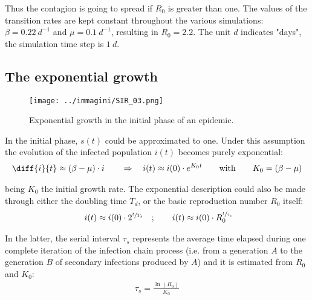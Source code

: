 \documentclass[DIV=12, BCOR=0pt]{scrartcl}  %
\begin{document}
  Thus the contagion is going to spread if $R_{0}$ is greater than one. The values of the transition rates are kept constant throughout the various simulations: $\beta = 0.22 \ d^{-1}$ and $\mu = 0.1 \ d^{-1}$, resulting in $R_{0} = 2.2$. The unit $d$ indicates "days", the simulation time step is $1 \ d$.
  
  
  
  
  
  \subsection{The exponential growth}
  
  \begin{figure}[h!]
  	\centering
  	\texttt{[image: ../immagini/SIR\_03.png]}
  	\caption{Exponential growth in the initial phase of an epidemic. }
  	\label{fig:SIRexp}
  \end{figure}
  
  In the initial phase, $s(t)$ could be approximated to one. %
  Under this assumption the evolution of the infected population $i(t)$ becomes purely exponential:
  \begin{align}
  	\diff{i}{t} \approx  (\beta - \mu) \cdot i \qquad \Rightarrow \quad 	i(t) \approx i(0) \cdot e^{K_{0} t} \qquad \mathrm{with} \qquad K_{0} = (\beta - \mu)
  \end{align}
	
	being $K_{0}$ the initial growth rate. The exponential description could also be made through either the doubling time $T_{d}$, or the basic reproduction number $R_{0}$ itself:
	\begin{align}
		\ i(t) \approx i(0) \cdot 2^{\sfrac{t}{T_{d}}} \quad ; \qquad i(t) \approx i(0) \cdot R_{0}^{\sfrac{t}{\tau_{s}}}
	\end{align}
	
	In the latter, the serial interval $\tau_{s}$ represents the average time elapsed during one complete iteration of the infection chain process (i.e. from a generation $A$ to the generation $B$ of secondary infections produced by $A$) and it is estimated from $R_{0}$ and $K_{0}$: 
	\begin{align}
		\tau_{s} = \frac{\ln(R_{0})}{K_{0}}
	\end{align}
\end{document}
